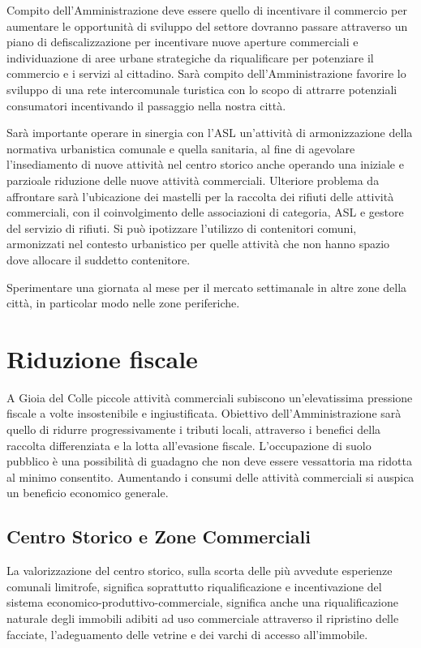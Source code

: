 \documentclass[a4paper,14pt,italian]{sphinxmanual}
\begin{document}
Compito dell’Amministrazione deve essere quello di incentivare il commercio per aumentare le opportunità di sviluppo del settore dovranno passare attraverso un piano di defiscalizzazione per incentivare nuove aperture commerciali e individuazione di aree urbane strategiche da riqualificare per potenziare il commercio e i servizi al cittadino.
Sarà compito dell’Amministrazione favorire lo sviluppo di una rete intercomunale turistica con lo scopo di attrarre potenziali consumatori incentivando il passaggio nella nostra città.

Sarà importante operare in sinergia con l’ASL un’attività di armonizzazione della normativa urbanistica comunale e quella sanitaria, al fine di agevolare l’insediamento di nuove attività nel centro storico anche operando una iniziale e parzioale riduzione delle nuove attività commerciali.
Ulteriore problema da affrontare sarà l’ubicazione dei mastelli per la raccolta dei rifiuti delle attività commerciali, con il coinvolgimento delle associazioni di categoria, ASL e gestore del servizio di rifiuti.
Si può ipotizzare l’utilizzo di contenitori comuni, armonizzati nel contesto urbanistico per quelle attività che non hanno spazio dove allocare il suddetto contenitore.

Sperimentare una giornata al mese per il mercato settimanale in altre zone della città, in particolar modo nelle zone periferiche.


\section{Riduzione fiscale}
\label{\detokenize{commercio:riduzione-fiscale}}
A Gioia del Colle piccole attività commerciali subiscono un’elevatissima pressione fiscale a volte insostenibile e ingiustificata.
Obiettivo dell’Amministrazione sarà quello di ridurre progressivamente i tributi locali, attraverso i benefici della raccolta differenziata e la lotta all’evasione fiscale.
L’occupazione di suolo pubblico è una possibilità di guadagno che non deve essere vessattoria ma ridotta al minimo consentito.
Aumentando i consumi delle attività commerciali si auspica un beneficio economico generale.


\subsection{Centro Storico e Zone Commerciali}
\label{\detokenize{commercio:centro-storico-e-zone-commerciali}}
La valorizzazione del centro storico, sulla scorta delle più avvedute esperienze comunali limitrofe, significa soprattutto riqualificazione e incentivazione del sistema economico-produttivo-commerciale, significa anche una riqualificazione naturale degli immobili adibiti ad uso commerciale attraverso il ripristino delle facciate, l’adeguamento delle vetrine e dei varchi di accesso all’immobile.
\end{document}
